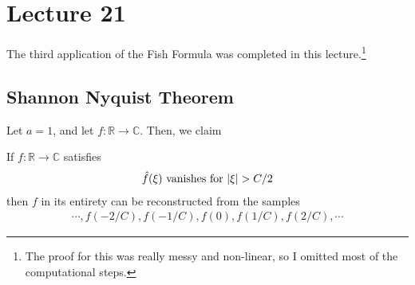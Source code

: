 \section{Lecture 21}
The third application of the Fish Formula was completed in this lecture.\footnote{The proof for this was really messy and non-linear, so I omitted most of the computational steps.}
\subsection{Shannon Nyquist Theorem}
Let $a=1$, and let $f: \mathbb{R} \to \mathbb{C}$. Then, we claim
\begin{lemma}
    If $f: \mathbb{R} \to \mathbb{C}$ satisfies
    \begin{align}
        \hat{f}(\xi) \text{ vanishes for $\abs{\xi} > C/2$}
    \end{align}
    then $f$ in its entirety can be reconstructed from the samples
    \begin{align}
        \cdots, f(-2/C), f(-1/C), f(0), f(1/C), f(2/C), \cdots
    \end{align}
\end{lemma}
